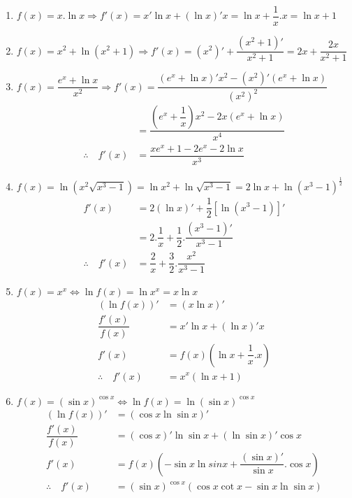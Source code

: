 \documentclass[a4paper,12pt]{article}
\begin{document}
\solution
\begin{enumerate}
	\item $f(x)=x.\ln x\Longrightarrow f'(x)=x'\ln x+(\ln x)' x=\ln x+\dfrac{1}{x}.x=\ln x+1$
	\item $f(x)=x^2+\ln (x^2+1)\Longrightarrow f'(x)=(x^2)'+\dfrac{(x^2+1)'}{x^2+1}=2x+\dfrac{2x}{x^2+1}$
	\item $f(x)=\dfrac{e^x+\ln x}{x^2}\Longrightarrow f'(x)=\dfrac{(e^x+\ln x)'x^2-(x^2)'(e^x+\ln x)}{(x^2)^2}$
	      \begin{align*}
		                             & =\dfrac{\left(e^x+\dfrac{1}{x}\right)x^2-2x(e^x+\ln x)}{x^4} \\
		      \therefore \quad f'(x) & =\dfrac{xe^x+1-2e^x-2\ln x}{x^3}
	      \end{align*}
	\item $f(x)=\ln (x^2 \sqrt{x^3-1})=\ln x^2 +\ln \sqrt{x^3-1}=2\ln x+ \ln (x^3-1)^{\frac{1}{2}}$
	      \begin{align*}
		      f'(x)                  & =2(\ln x)'+\dfrac{1}{2}[\ln (x^3-1)]'                \\
		                             & =2.\dfrac{1}{x}+\dfrac{1}{2}.\dfrac{(x^3-1)'}{x^3-1} \\
		      \therefore \quad f'(x) & =\dfrac{2}{x}+\dfrac{3}{2}.\dfrac{x^2}{x^3-1}
	      \end{align*}
	\item $f(x)=x^x \Longleftrightarrow \ln f(x)=\ln x^x=x\ln x $
	      \begin{align*}
		      \left(\ln f(x)\right)' & =(x\ln x)'                  \\
		      \dfrac{f'(x)}{f(x)}    & =x'\ln x+(\ln x)'x          \\
		      f'(x)                  & =f(x)(\ln x+\dfrac{1}{x}.x) \\
		      \therefore \quad f'(x) & =x^x(\ln x+1)
	      \end{align*}
	\item $f(x)=(\sin x)^{\cos x}\Longleftrightarrow \ln f(x)=\ln (\sin x)^{\cos x}$
	      \begin{align*}
		      \left(\ln f(x) \right)' & = (\cos x\ln \sin x)'                                                \\
		      \dfrac{f'(x)}{f(x)}     & =(\cos x)'\ln \sin x+(\ln \sin x)'\cos x                             \\
		      f'(x)                   & =f(x)\left(-\sin x\ln sin x+\dfrac{(\sin x)'}{\sin x}.\cos x \right) \\
		      \therefore \quad f'(x)  & =(\sin x)^{\cos x} \left( \cos x\cot x-\sin x\ln \sin x\right)
	      \end{align*}
\end{enumerate}
\end{document}
